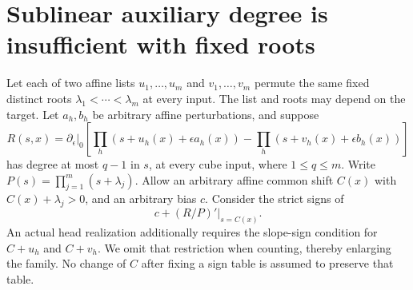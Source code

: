 \documentclass[11pt]{article}
\begin{document}
\section{Sublinear auxiliary degree is insufficient with fixed roots}

Let each of two affine lists $u_1,\ldots,u_m$ and $v_1,\ldots,v_m$
permute the same fixed distinct roots $\lambda_1<\cdots<\lambda_m$
at every input. The list and roots may depend on the target. Let
$a_h,b_h$ be arbitrary affine perturbations, and suppose
\[
 R(s,x)=\left.\partial_\epsilon\right|_0
   \left[\prod_h(s+u_h(x)+\epsilon a_h(x))
         -\prod_h(s+v_h(x)+\epsilon b_h(x))\right]
 \tag{8}
\]
has degree at most $q-1$ in $s$, at every cube input, where
$1\le q\le m$. Write $P(s)=\prod_{j=1}^m(s+\lambda_j)$.
Allow an arbitrary affine common shift $C(x)$ with
$C(x)+\lambda_j>0$, and an arbitrary bias $c$. Consider the strict
signs of
\[
                   c+\left.(R/P)'\right|_{s=C(x)}.
 \tag{9}
\]
An actual head realization additionally requires the slope-sign
condition for $C+u_h$ and $C+v_h$. We omit that restriction when
counting, thereby enlarging the family. No change of $C$ after
fixing a sign table is assumed to preserve that table.
\end{document}
